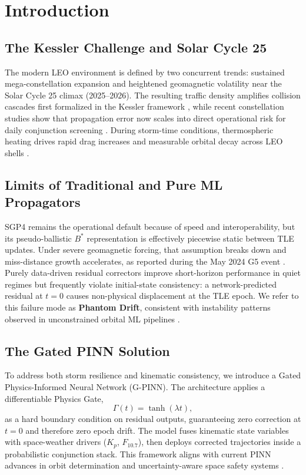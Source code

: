 \section{Introduction}\label{sec:intro}

\subsection{The Kessler Challenge and Solar Cycle 25}
The modern LEO environment is defined by two concurrent trends: sustained mega-constellation expansion and heightened geomagnetic volatility near the Solar Cycle 25 climax (2025--2026). The resulting traffic density amplifies collision cascades first formalized in the Kessler framework \cite{kessler1978collision}, while recent constellation studies show that propagation error now scales into direct operational risk for daily conjunction screening \cite{chen2025oneweb,kang2025solar}. During storm-time conditions, thermospheric heating drives rapid drag increases and measurable orbital decay across LEO shells \cite{oliveira2021current,walter2025orbital}.

\subsection{Limits of Traditional and Pure ML Propagators}
SGP4 remains the operational default because of speed and interoperability, but its pseudo-ballistic $B^*$ representation is effectively piecewise static between TLE updates. Under severe geomagnetic forcing, that assumption breaks down and miss-distance growth accelerates, as reported during the May 2024 G5 event \cite{parker2024satellite,dey2024improving}. Purely data-driven residual correctors improve short-horizon performance in quiet regimes but frequently violate initial-state consistency: a network-predicted residual at $t=0$ causes non-physical displacement at the TLE epoch. We refer to this failure mode as \textbf{Phantom Drift}, consistent with instability patterns observed in unconstrained orbital ML pipelines \cite{kozhaya2021comparison,bertolini2024hybrid}.

\subsection{The Gated PINN Solution}
To address both storm resilience and kinematic consistency, we introduce a Gated Physics-Informed Neural Network (G-PINN). The architecture applies a differentiable Physics Gate,
\begin{equation}
\Gamma(t)=\tanh(\lambda t),
\end{equation}
as a hard boundary condition on residual outputs, guaranteeing zero correction at $t=0$ and therefore zero epoch drift. The model fuses kinematic state variables with space-weather drivers ($K_p$, $F_{10.7}$), then deploys corrected trajectories inside a probabilistic conjunction stack. This framework aligns with current PINN advances in orbit determination and uncertainty-aware space safety systems \cite{loshelder2025od,ramesh2025space}.

